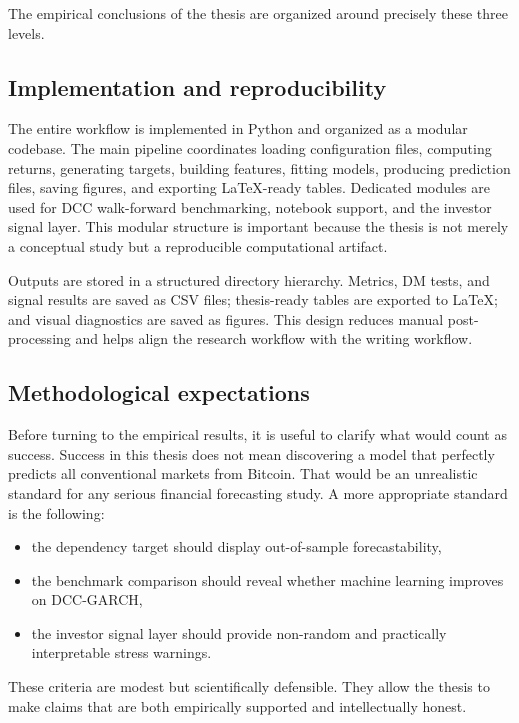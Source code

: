 The empirical conclusions of the thesis are organized around precisely these three levels.

\subsection{Implementation and reproducibility}

The entire workflow is implemented in Python and organized as a modular codebase. The main pipeline coordinates loading configuration files, computing returns, generating targets, building features, fitting models, producing prediction files, saving figures, and exporting LaTeX-ready tables. Dedicated modules are used for DCC walk-forward benchmarking, notebook support, and the investor signal layer. This modular structure is important because the thesis is not merely a conceptual study but a reproducible computational artifact.

Outputs are stored in a structured directory hierarchy. Metrics, DM tests, and signal results are saved as CSV files; thesis-ready tables are exported to LaTeX; and visual diagnostics are saved as figures. This design reduces manual post-processing and helps align the research workflow with the writing workflow.

\subsection{Methodological expectations}

Before turning to the empirical results, it is useful to clarify what would count as success. Success in this thesis does not mean discovering a model that perfectly predicts all conventional markets from Bitcoin. That would be an unrealistic standard for any serious financial forecasting study. A more appropriate standard is the following:

\begin{itemize}
    \item the dependency target should display out-of-sample forecastability,
    \item the benchmark comparison should reveal whether machine learning improves on DCC-GARCH,
    \item the investor signal layer should provide non-random and practically interpretable stress warnings.
\end{itemize}

These criteria are modest but scientifically defensible. They allow the thesis to make claims that are both empirically supported and intellectually honest.
